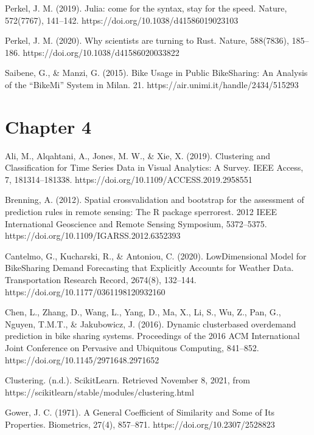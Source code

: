 \documentclass[letterpaper,10pt,english]{jupyterBook}
\begin{document}
\sphinxAtStartPar
Perkel, J. M. (2019). Julia: come for the syntax, stay for the speed. Nature, 572(7767), 141–142. https://doi.org/10.1038/d41586\sphinxhyphen{}019\sphinxhyphen{}02310\sphinxhyphen{}3

\sphinxAtStartPar
Perkel, J. M. (2020). Why scientists are turning to Rust. Nature, 588(7836), 185–186. https://doi.org/10.1038/d41586\sphinxhyphen{}020\sphinxhyphen{}03382\sphinxhyphen{}2

\sphinxAtStartPar
Saibene, G., \& Manzi, G. (2015). Bike Usage in Public Bike\sphinxhyphen{}Sharing: An Analysis of the “BikeMi” System in Milan. 21. https://air.unimi.it/handle/2434/515293


\section{Chapter 4}
\label{\detokenize{references:chapter-4}}
\sphinxAtStartPar
Ali, M., Alqahtani, A., Jones, M. W., \& Xie, X. (2019). Clustering and Classification for Time Series Data in Visual Analytics: A Survey. IEEE Access, 7, 181314–181338. https://doi.org/10.1109/ACCESS.2019.2958551

\sphinxAtStartPar
Brenning, A. (2012). Spatial cross\sphinxhyphen{}validation and bootstrap for the assessment of prediction rules in remote sensing: The R package sperrorest. 2012 IEEE International Geoscience and Remote Sensing Symposium, 5372–5375. https://doi.org/10.1109/IGARSS.2012.6352393

\sphinxAtStartPar
Cantelmo, G., Kucharski, R., \& Antoniou, C. (2020). Low\sphinxhyphen{}Dimensional Model for Bike\sphinxhyphen{}Sharing Demand Forecasting that Explicitly Accounts for Weather Data. Transportation Research Record, 2674(8), 132–144. https://doi.org/10.1177/0361198120932160

\sphinxAtStartPar
Chen, L., Zhang, D., Wang, L., Yang, D., Ma, X., Li, S., Wu, Z., Pan, G., Nguyen, T.\sphinxhyphen{}M.\sphinxhyphen{}T., \& Jakubowicz, J. (2016). Dynamic cluster\sphinxhyphen{}based over\sphinxhyphen{}demand prediction in bike sharing systems. Proceedings of the 2016 ACM International Joint Conference on Pervasive and Ubiquitous Computing, 841–852. https://doi.org/10.1145/2971648.2971652

\sphinxAtStartPar
Clustering. (n.d.). Scikit\sphinxhyphen{}Learn. Retrieved November 8, 2021, from https://scikit\sphinxhyphen{}learn/stable/modules/clustering.html

\sphinxAtStartPar
Gower, J. C. (1971). A General Coefficient of Similarity and Some of Its Properties. Biometrics, 27(4), 857–871. https://doi.org/10.2307/2528823
\end{document}

